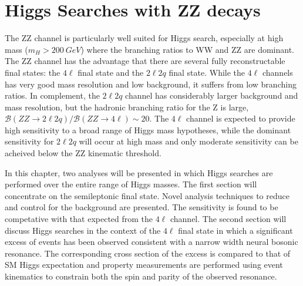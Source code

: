\chapter{Higgs Searches with ZZ decays}
\label{sec:HZZsearches}

The ZZ channel is particularly well suited for Higgs search, 
especially at high mass ($m_H>200~GeV$)
where the branching ratios to WW and ZZ are dominant.  The ZZ 
channel has the advantage that there are several fully 
reconstructable final states: the $4\ell$ final state and the 
$2\ell 2q$ final state.  While the $4\ell$ channels has very good 
mass resolution and low background, it suffers from low branching 
ratios.  In complement, the 
$2\ell2q$ channel has considerably larger background and mass 
resolution, but the hadronic branching ratio for the Z is large, 
$\mathscr{B}(ZZ\to 2\ell2q)/\mathscr{B}(ZZ\to 4\ell)\sim20$.  The $4\ell$ channel is 
expected to provide high sensitivity to a broad range of Higgs 
mass hypotheses, while the dominant sensitivity for $2\ell 2q$ 
will occur at high mass and only moderate sensitivity can be 
acheived below the ZZ kinematic threshold.

In this chapter, two analyses will be presented in which Higgs 
searches are performed over the entire range of Higgs masses.  
The first section will concentrate on the semileptonic final state.
Novel analysis techniques to reduce and control for the background
are presented.  The sensitivity is found to be competative with 
that expected from the $4\ell$ channel.  The second section will 
discuss Higgs searches in the context of the $4\ell$ final state in
which a significant excess of events has been observed consistent 
with a narrow width neural bosonic resonance.  The corresponding 
cross section of the excess is compared to that of SM Higgs 
expectation and property measurements are performed using event 
kinematics to constrain both the spin and parity of the observed 
resonance. 

